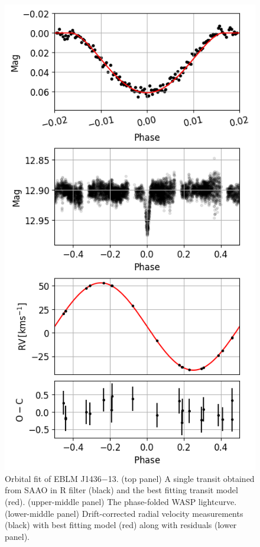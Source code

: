 \begin{figure}[htb]
  \centering
  \includegraphics[scale=0.8]{8-Results/J1436-13/J1436-13_paper_plot.png}
  \caption{Orbital fit of EBLM J1436$-$13. (top panel) A single transit obtained from SAAO in R filter (black) and the best fitting transit model (red). (upper-middle panel) The phase-folded WASP lightcurve. (lower-middle panel) Drift-corrected radial velocity measurements (black) with best fitting model (red) along with residuals (lower panel). }
  \label{fig:1436-13:orbit}
\end{figure}

